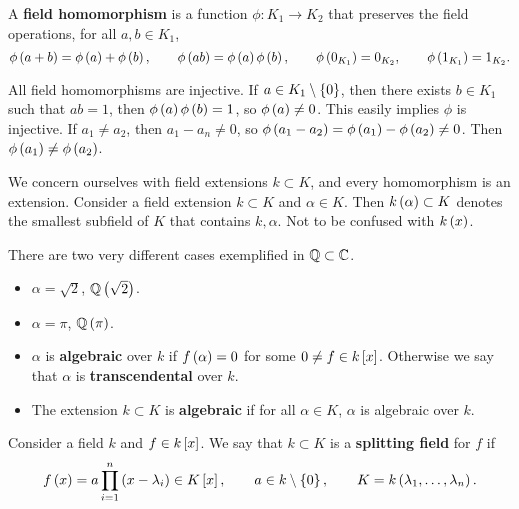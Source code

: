 
\begin{definition}
A \textbf{field homomorphism} is a function $ \phi : K_1 \to K_2 $ that preserves the field operations, for all $ a, b \in K_1 $,
$$ \phi\rb{a + b} = \phi\rb{a} + \phi\rb{b}, \qquad \phi\rb{ab} = \phi\rb{a}\phi\rb{b}, \qquad \phi\rb{0_{K_1}} = 0_{K_2}, \qquad \phi\rb{1_{K_1}} = 1_{K_2}. $$
\end{definition}

\begin{remark}
All field homomorphisms are injective. If $ a \in K_1 \setminus \cb{0} $, then there exists $ b \in K_1 $ such that $ ab = 1 $, then $ \phi\rb{a}\phi\rb{b} = 1 $, so $ \phi\rb{a} \ne 0 $. This easily implies $ \phi $ is injective. If $ a_1 \ne a_2 $, then $ a_1 - a_n \ne 0 $, so $ \phi\rb{a_1 - a_2} = \phi\rb{a_1} - \phi\rb{a_2} \ne 0 $. Then $ \phi\rb{a_1} \ne \phi\rb{a_2} $.
\end{remark}

We concern ourselves with field extensions $ k \subset K $, and every homomorphism is an extension. Consider a field extension $ k \subset K $ and $ \alpha \in K $. Then $ k\rb{\alpha} \subset K $ denotes the smallest subfield of $ K $ that contains $ k, \alpha $. Not to be confused with $ k\rb{x} $.

\begin{example}
There are two very different cases exemplified in $ \Q \subset \C $.
\begin{itemize}
\item $ \alpha = \sqrt{2} $, $ \Q\rb{\sqrt{2}} $.
\item $ \alpha = \pi $, $ \Q\rb{\pi} $.
\end{itemize}
\end{example}

\begin{definition}
\hfill
\begin{itemize}
\item $ \alpha $ is \textbf{algebraic} over $ k $ if $ f\rb{\alpha} = 0 $ for some $ 0 \ne f \in k\sb{x} $. Otherwise we say that $ \alpha $ is \textbf{transcendental} over $ k $.
\item The extension $ k \subset K $ is \textbf{algebraic} if for all $ \alpha \in K $, $ \alpha $ is algebraic over $ k $.
\end{itemize}
\end{definition}

\begin{definition}
Consider a field $ k $ and $ f \in k\sb{x} $. We say that $ k \subset K $ is a \textbf{splitting field} for $ f $ if
$$ f\rb{x} = a\prod_{i = 1}^n \rb{x - \lambda_i} \in K\sb{x}, \qquad a \in k \setminus \cb{0}, \qquad K = k\rb{\lambda_1, \dots, \lambda_n}. $$
\end{definition}

